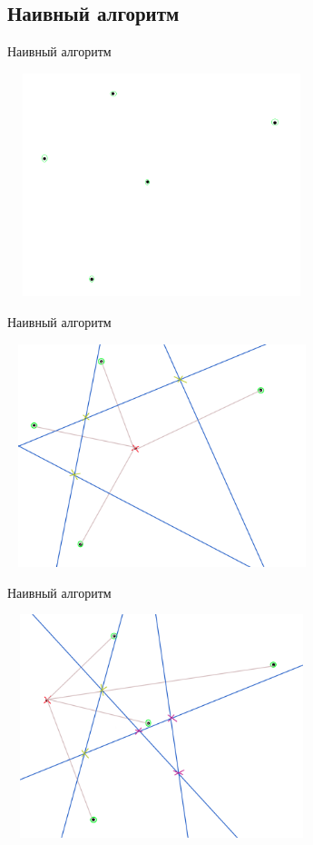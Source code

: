 \documentclass[10pt]{beamer}
\begin{document}
\subsection{Наивный алгоритм}
\begin{frame}[fragile]{Наивный алгоритм}
\begin{center}
\includegraphics[width=9cm, height=6.5cm]{Term_3/Source/Pictures/voronoi0.png}
\end{center}
\end{frame}

\begin{frame}[fragile]{Наивный алгоритм}
\begin{center}
\includegraphics[width=9cm, height=6.5cm]{Term_3/Source/Pictures/voronoi1.png}
\end{center}
\end{frame}

\begin{frame}[fragile]{Наивный алгоритм}
\begin{center}
\includegraphics[width=9cm, height=6.5cm]{Term_3/Source/Pictures/voronoi2.png}
\end{center}
\end{frame}
\end{document}
